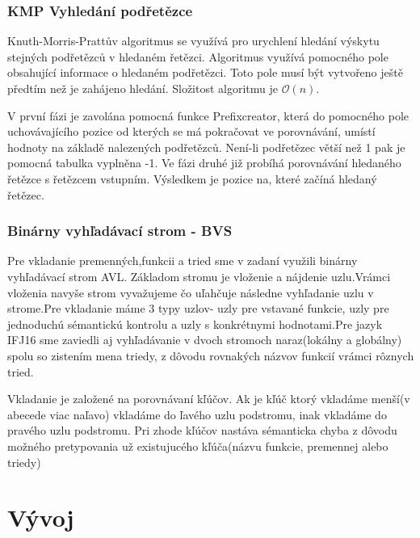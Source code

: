 \documentclass[12pt,a4paper]{report}
\begin{document}
\subsection{KMP Vyhledání podřetězce}
\par Knuth-Morris-Prattův algoritmus se využívá pro urychlení hledání výskytu stejných podřetězců v hledaném řetězci. Algoritmus využívá pomocného pole obsahující informace o hledaném podřetězci. Toto pole musí být vytvořeno ještě předtím než je zahájeno hledání. Složitost algoritmu je $\mathcal{O}(n)$.
\par V první fázi je zavolána pomocná funkce Prefixcreator, která do pomocného pole uchovávajícího pozice od kterých se má pokračovat ve porovnávání, umístí hodnoty na základě nalezených podřetězců. Není-li podřetězec větší než 1 pak je pomocná tabulka vyplněna -1.
Ve fázi druhé již probíhá porovnávání hledaného řetězce s řetězcem vstupním. Výsledkem je pozice na, které začíná hledaný řetězec.


\subsection{Binárny vyhľadávací strom - BVS}
\par Pre vkladanie premenných,funkcii a tried sme v zadaní využili binárny vyhľadávací strom AVL. Základom stromu je vloženie a nájdenie uzlu.Vrámci vloženia navyše strom vyvažujeme čo uľahčuje následne vyhľadanie uzlu v strome.Pre vkladanie máme 3 typy uzlov- uzly pre vstavané funkcie, uzly pre jednoduchú sémantickú kontrolu a uzly s konkrétnymi hodnotami.Pre jazyk IFJ16 sme zaviedli aj vyhľadávanie v dvoch stromoch naraz(lokálny a globálny) spolu so zistením mena triedy, z dôvodu rovnakých názvov funkcií vrámci rôznych tried.
\par Vkladanie je založené na porovnávaní kľúčov. Ak je kľúč ktorý vkladáme menší(v abecede viac naľavo) vkladáme do ľavého uzlu podstromu, inak vkladáme do pravého uzlu podstromu. Pri zhode kľúčov nastáva sémanticka chyba z dôvodu možného pretypovania už existujucého kľúča(názvu funkcie, premennej alebo triedy)

\chapter{Vývoj}
\end{document}
